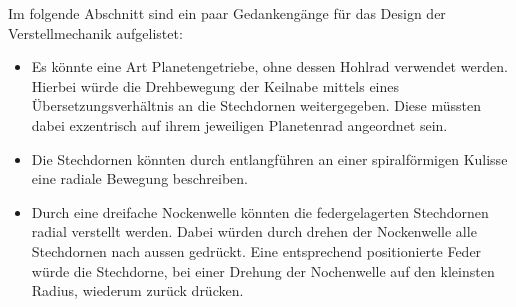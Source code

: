Im folgende Abschnitt sind ein paar Gedankengänge für das Design der Verstellmechanik aufgelistet:

\begin{itemize}
	\item Es könnte eine Art Planetengetriebe, ohne dessen Hohlrad verwendet werden. Hierbei würde die Drehbewegung der Keilnabe mittels eines Übersetzungsverhältnis an die Stechdornen weitergegeben. Diese müssten dabei exzentrisch auf ihrem jeweiligen Planetenrad angeordnet sein.
	\item Die Stechdornen könnten durch entlangführen an einer spiralförmigen Kulisse eine radiale Bewegung beschreiben.
	\item Durch eine dreifache Nockenwelle könnten die federgelagerten Stechdornen radial verstellt werden. Dabei würden durch drehen der Nockenwelle alle Stechdornen nach aussen gedrückt. Eine entsprechend positionierte Feder würde die Stechdorne, bei einer Drehung der Nochenwelle auf den kleinsten Radius, wiederum zurück drücken.
\end{itemize}

